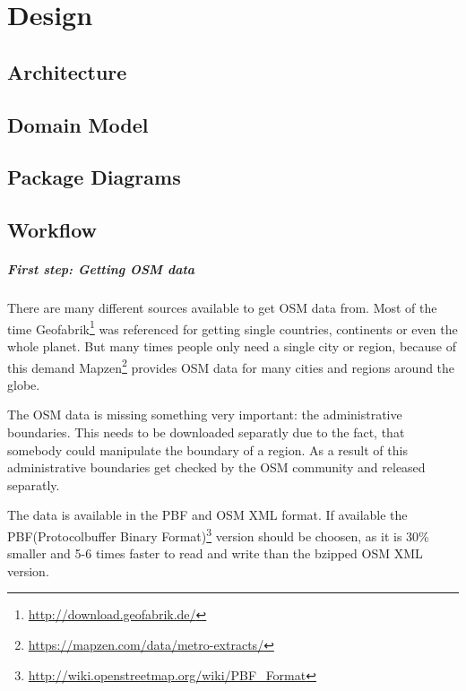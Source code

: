 \chapter{Design}\label{design}


\section{Architecture}\label{architecture}



\section{Domain Model}



\section{Package Diagrams}


\section{Workflow}\label{workflow}

\paragraph{First step: Getting OSM
data}\label{first-step-getting-osm-data}

There are many different sources available to get OSM data from. Most of
the time Geofabrik\footnote{\url{http://download.geofabrik.de/}} was
referenced for getting single countries, continents or even the whole
planet. But many times people only need a single city or region, because
of this demand
Mapzen\footnote{\url{https://mapzen.com/data/metro-extracts/}} provides
OSM data for many cities and regions around the globe.

The OSM data is missing something very important: the administrative
boundaries. This needs to be downloaded separatly due to the fact, that
somebody could manipulate the boundary of a region. As a result of this
administrative boundaries get checked by the OSM community and released
separatly.

The data is available in the PBF and OSM XML format. If available the
PBF(Protocolbuffer Binary
Format)\footnote{\url{http://wiki.openstreetmap.org/wiki/PBF_Format}}
version should be choosen, as it is 30\% smaller and 5-6 times faster to
read and write than the bzipped OSM XML version.

